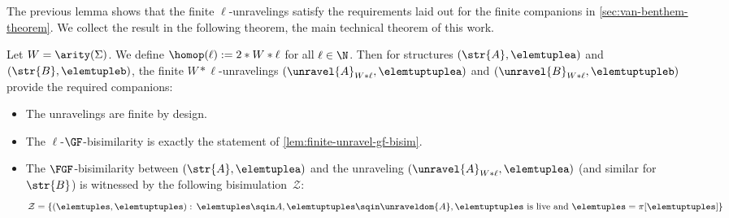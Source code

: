 The previous lemma shows that the finite $\ell$-unravelings satisfy the requirements laid out for the finite companions in \cref{sec:van-benthem-theorem}.
We collect the result in the following theorem, the main technical theorem of this work.
\maintechnicalthm
\begin{proofsketch}
  Let $W = \arity(\Sigma)$. We define $\homop(\ell) := 2 * W * \ell$ for all $\ell \in \N$.
  Then for structures $(\str{A}, \elemtuplea)$ and $(\str{B}, \elemtupleb)$, the finite $W * \ell$-unravelings $(\unravel{A}_{W * \ell}, \elemtuptuplea)$ and $(\unravel{B}_{W * \ell}, \elemtuptupleb)$ provide the required companions:
  \begin{itemize}
    \item The unravelings are finite by design.
    \item The $\ell$-$\GF$-bisimilarity is exactly the statement of \cref{lem:finite-unravel-gf-bisim}.
    \item The $\FGF$-bisimilarity between $(\str{A}, \elemtuplea)$ and the unraveling $(\unravel{A}_{W * \ell}, \elemtuplea)$ (and similar for $\str{B}$) is witnessed by the following bisimulation~$\mathcal{Z}$:
          \begin{equation*}
            \mathcal{Z} = \{ (\elemtuples, \elemtuptuples):\, \elemtuples \sqin A, \elemtuptuples \sqin \unraveldom{A}, \elemtuptuples \text{ is live and } \elemtuples = \pi[\elemtuptuples] \}
          \end{equation*}
  \end{itemize}
\end{proofsketch}
